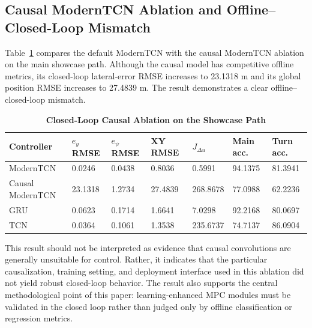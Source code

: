 \documentclass[twocolumn]{article}
\begin{document}
\subsection{Causal ModernTCN Ablation and Offline--Closed-Loop Mismatch}

Table~\ref{tab:causal_closed_loop} compares the default ModernTCN with the causal ModernTCN ablation on the main showcase path. Although the causal model has competitive offline metrics, its closed-loop lateral-error RMSE increases to 23.1318 m and its global position RMSE increases to 27.4839 m. The result demonstrates a clear offline--closed-loop mismatch.

\begin{table}[!t]

\caption{\textbf{Closed-Loop Causal Ablation on the Showcase Path}}

\label{tab:causal_closed_loop}

\setlength{\tabcolsep}{4pt}

\begin{tabular}{|p{105pt}|p{48pt}|p{48pt}|p{48pt}|p{55pt}|p{48pt}|p{48pt}|}

\hline

Controller & $e_y$ RMSE & $e_{\psi}$ RMSE & XY RMSE & $J_{\Delta u}$ & Main acc. & Turn acc. \\

\hline

ModernTCN & 0.0246 & 0.0438 & 0.8036 & 0.5991 & 94.1375 & 81.3941 \\

Causal ModernTCN & 23.1318 & 1.2734 & 27.4839 & 268.8678 & 77.0988 & 62.2236 \\

GRU & 0.0623 & 0.1714 & 1.6641 & 7.0298 & 92.2168 & 80.0697 \\

TCN & 0.0364 & 0.1061 & 1.3538 & 235.6737 & 74.7137 & 86.0904 \\

\hline

\end{tabular}

\end{table}

This result should not be interpreted as evidence that causal convolutions are generally unsuitable for control. Rather, it indicates that the particular causalization, training setting, and deployment interface used in this ablation did not yield robust closed-loop behavior. The result also supports the central methodological point of this paper: learning-enhanced MPC modules must be validated in the closed loop rather than judged only by offline classification or regression metrics.
\end{document}
